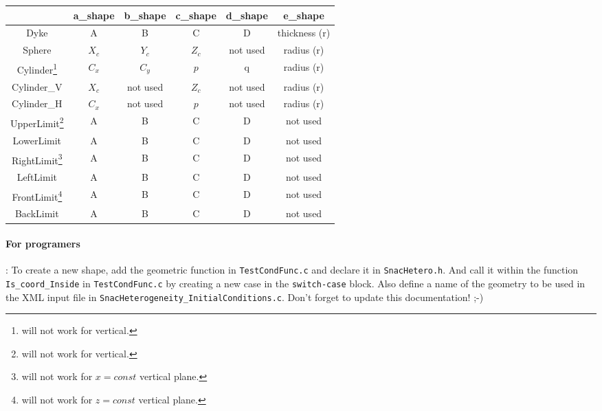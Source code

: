 \documentclass[letterpaper,11pt]{article}
\begin{document}
\begin{minipage}{1.0\linewidth}
\begin{tabular}{@{}cccccc@{}} \toprule
&a\_shape & b\_shape & c\_shape & d\_shape & e\_shape\\ \midrule
Dyke & A & B & C & D & thickness (r) \\ 
Sphere & $X_c$ & $Y_c$ & $Z_c$ & not used & radius (r) \\ 
Cylinder\footnote{will not work for vertical.} & $C_x$ & $C_y$ & $p$ & q & radius (r) \\ 
Cylinder\_V & $X_c$ & not used & $Z_c$ & not used & radius (r) \\ 
Cylinder\_H & $C_x$ & not used & $p$ & not used & radius (r) \\ 
UpperLimit\footnote{will not work for vertical.} & A & B & C & D & not used \\ 
LowerLimit & A & B & C & D & not used \\ 
RightLimit\footnote{will not work for $x=const$ vertical plane.} & A & B & C & D & not used \\ 
LeftLimit & A & B & C & D & not used \\ 
FrontLimit\footnote{will not work for $z=const$ vertical plane.} & A & B & C & D & not used \\ 
BackLimit & A & B & C & D & not used \\ \bottomrule
\end{tabular}
\end{minipage}

\paragraph{For programers}: To create a new shape, add the geometric
function in \texttt{TestCondFunc.c} and declare it in
\texttt{SnacHetero.h}. And call it within the function
\texttt{Is\_coord\_Inside} in \texttt{TestCondFunc.c} by creating a new
case in the \texttt{switch-case} block. Also define a name of
the geometry to be used in the XML input file in
\texttt{SnacHeterogeneity\_InitialConditions.c}. Don't forget to update
this documentation! ;-)
\end{document}
